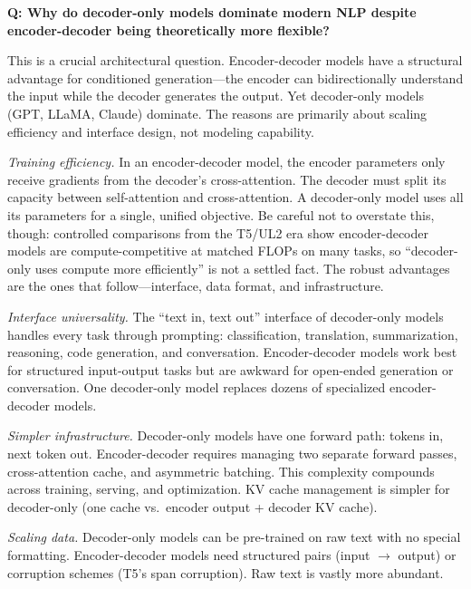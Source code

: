 \begin{interviewq}
\textbf{Q: Why do decoder-only models dominate modern NLP despite encoder-decoder being theoretically more flexible?}

 \quad {} \quad \badgefreq{\freqhigh}

\stronganswer This is a crucial architectural question. Encoder-decoder models have a structural advantage for conditioned generation---the encoder can bidirectionally understand the input while the decoder generates the output. Yet decoder-only models (GPT, LLaMA, Claude) dominate. The reasons are primarily about scaling efficiency and interface design, not modeling capability.

\textit{Training efficiency.} In an encoder-decoder model, the encoder parameters only receive gradients from the decoder's cross-attention. The decoder must split its capacity between self-attention and cross-attention. A decoder-only model uses all its parameters for a single, unified objective. Be careful not to overstate this, though: controlled comparisons from the T5/UL2 era show encoder-decoder models are compute-competitive at matched FLOPs on many tasks, so ``decoder-only uses compute more efficiently'' is not a settled fact. The robust advantages are the ones that follow---interface, data format, and infrastructure.

\textit{Interface universality.} The ``text in, text out'' interface of decoder-only models handles every task through prompting: classification, translation, summarization, reasoning, code generation, and conversation. Encoder-decoder models work best for structured input-output tasks but are awkward for open-ended generation or conversation. One decoder-only model replaces dozens of specialized encoder-decoder models.

\textit{Simpler infrastructure.} Decoder-only models have one forward path: tokens in, next token out. Encoder-decoder requires managing two separate forward passes, cross-attention cache, and asymmetric batching. This complexity compounds across training, serving, and optimization. KV cache management is simpler for decoder-only (one cache vs.\ encoder output + decoder KV cache).

\textit{Scaling data.} Decoder-only models can be pre-trained on raw text with no special formatting. Encoder-decoder models need structured pairs (input $\to$ output) or corruption schemes (T5's span corruption). Raw text is vastly more abundant.


\end{interviewq}
